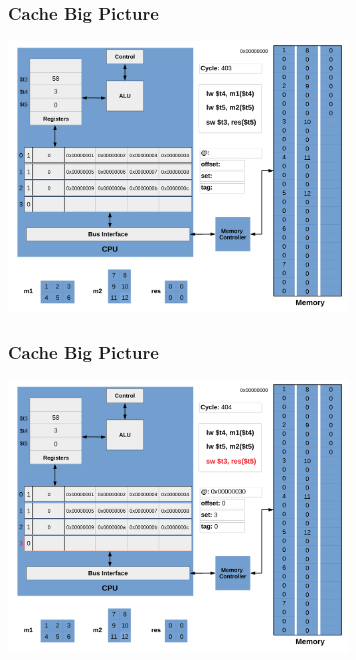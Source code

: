 \documentclass{beamer}
\begin{document}
\begin{frame}[fragile]
\frametitle{Cache Big Picture}

\begin{center}
\vspace*{-0.23cm}
\hspace*{-1cm}\includegraphics[width=9cm]{cache35.pdf}
\end{center}

\end{frame}

\begin{frame}[fragile]
\frametitle{Cache Big Picture}

\begin{center}
\vspace*{-0.23cm}
\hspace*{-1cm}\includegraphics[width=9cm]{cache36.pdf}
\end{center}

\end{frame}
\end{document}

